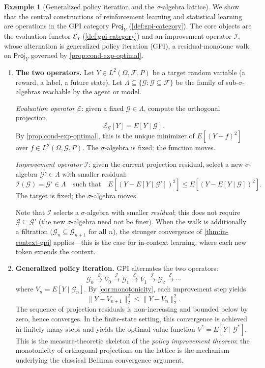 \documentclass[12pt]{amsart}
\theoremstyle{definition}
\newtheorem{example}[theorem]{Example}
\theoremstyle{remark}
\newcommand{\cF}{\mathcal{F}}
\newcommand{\Proj}{\mathsf{Proj}}
\begin{document}
\begin{example}[Generalized policy iteration and the $\sigma$-algebra lattice]\label{ex:ml-sigma}
We show that the central constructions of reinforcement learning and statistical learning are operations in the GPI category $\Proj_Y$ (\cref{def:gpi-category}). The core objects are the evaluation functor $\mathcal{E}_Y$ (\cref{def:gpi-category}) and an improvement operator $\mathcal{I}$, whose alternation is generalized policy iteration (GPI), a residual-monotone walk on $\Proj_Y$ governed by \cref{prop:cond-exp-optimal}.

\begin{enumerate}[label=(\alph*)]

\item \textbf{The two operators.} Let $Y \in L^2(\Omega, \cF, P)$ be a target random variable (a reward, a label, a future state). Let $\Lambda \subseteq \{\mathcal{G} : \mathcal{G} \subseteq \cF\}$ be the family of sub-$\sigma$-algebras reachable by the agent or model.

\emph{Evaluation operator} $\mathcal{E}$: given a fixed $\mathcal{G} \in \Lambda$, compute the orthogonal projection
\[
\mathcal{E}_{\mathcal{G}}[Y] = E[Y \mid \mathcal{G}].
\]
By \cref{prop:cond-exp-optimal}, this is the unique minimizer of $E[(Y - f)^2]$ over $f \in L^2(\Omega, \mathcal{G}, P)$. The $\sigma$-algebra is fixed; the function moves.

\emph{Improvement operator} $\mathcal{I}$: given the current projection residual, select a new $\sigma$-algebra $\mathcal{G}' \in \Lambda$ with smaller residual:
\[
\mathcal{I}(\mathcal{G}) = \mathcal{G}' \in \Lambda \quad \text{such that} \quad E[(Y - E[Y \mid \mathcal{G}'])^2] \leq E[(Y - E[Y \mid \mathcal{G}])^2].
\]
The target is fixed; the $\sigma$-algebra moves.

Note that $\mathcal{I}$ selects a $\sigma$-algebra with smaller \emph{residual}; this does not require $\mathcal{G} \subseteq \mathcal{G}'$ (the new $\sigma$-algebra need not be finer). When the walk is additionally a filtration ($\mathcal{G}_n \subseteq \mathcal{G}_{n+1}$ for all $n$), the stronger convergence of \cref{thm:in-context-gpi} applies---this is the case for in-context learning, where each new token extends the context.

\item \textbf{Generalized policy iteration.} GPI alternates the two operators:
\[
\mathcal{G}_0 \xrightarrow{\;\mathcal{E}\;} V_0 \xrightarrow{\;\mathcal{I}\;} \mathcal{G}_1 \xrightarrow{\;\mathcal{E}\;} V_1 \xrightarrow{\;\mathcal{I}\;} \mathcal{G}_2 \xrightarrow{\;\mathcal{E}\;} \cdots
\]
where $V_n = E[Y \mid \mathcal{G}_n]$. By \cref{cor:monotonicity}, each improvement step yields
\[
\|Y - V_{n+1}\|_2^2 \leq \|Y - V_n\|_2^2.
\]
The sequence of projection residuals is non-increasing and bounded below by zero, hence converges. In the finite-state setting, this convergence is achieved in finitely many steps and yields the optimal value function $V^* = E[Y \mid \mathcal{G}^*]$. This is the measure-theoretic skeleton of the \emph{policy improvement theorem}: the monotonicity of orthogonal projections on the lattice is the mechanism underlying the classical Bellman convergence argument.


\end{enumerate}
\end{example}
\end{document}
